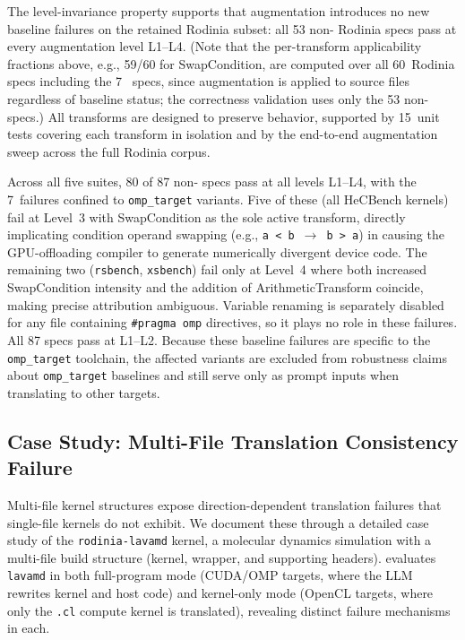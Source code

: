 The level-invariance property supports that augmentation introduces no new baseline failures on the retained Rodinia subset: all 53 non-\knownfail{} Rodinia specs pass at every augmentation level L1--L4. (Note that the per-transform applicability fractions above, e.g., 59/60 for SwapCondition, are computed over all 60~Rodinia specs including the 7~\knownfail{} specs, since augmentation is applied to source files regardless of baseline status; the correctness validation uses only the 53 non-\knownfail{} specs.) All transforms are designed to preserve behavior, supported by 15~unit tests covering each transform in isolation and by the end-to-end augmentation sweep across the full Rodinia corpus.

Across all five suites, 80 of 87 non-\knownfail{} specs pass at all levels L1--L4, with the 7~failures confined to \texttt{omp\_target} variants. Five of these (all HeCBench kernels) fail at Level~3 with SwapCondition as the sole active transform, directly implicating condition operand swapping (e.g., \texttt{a~<~b}~$\to$~\texttt{b~>~a}) in causing the GPU-offloading compiler to generate numerically divergent device code. The remaining two (\texttt{rsbench}, \texttt{xsbench}) fail only at Level~4 where both increased SwapCondition intensity and the addition of ArithmeticTransform coincide, making precise attribution ambiguous. Variable renaming is separately disabled for any file containing \texttt{\#pragma~omp} directives, so it plays no role in these failures. All 87 specs pass at L1--L2. Because these baseline failures are specific to the \texttt{omp\_target} toolchain, the affected variants are excluded from robustness claims about \texttt{omp\_target} baselines and still serve only as prompt inputs when translating to other targets.


\subsection{Case Study: Multi-File Translation Consistency Failure}
\label{sec:appendix-e3}

Multi-file kernel structures expose direction-dependent translation failures that single-file kernels do not exhibit. We document these through a detailed case study of the \texttt{rodinia-lavamd} kernel, a molecular dynamics simulation with a multi-file build structure (kernel, wrapper, and supporting headers). \parbench{} evaluates \texttt{lavamd} in both full-program mode (CUDA/OMP targets, where the LLM rewrites kernel and host code) and kernel-only mode (OpenCL targets, where only the \texttt{.cl} compute kernel is translated), revealing distinct failure mechanisms in each.

